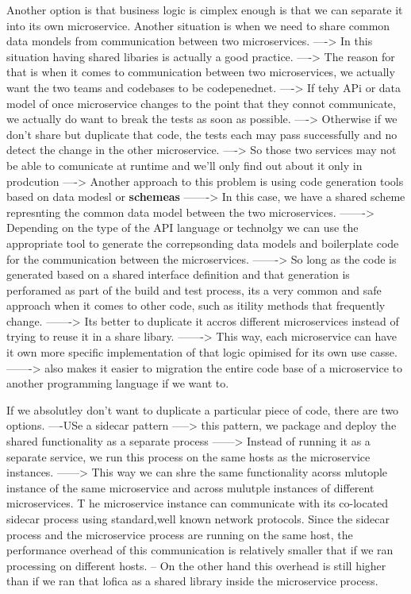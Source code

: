 \documentclass[a4paper, 11pt]{book}
\begin{document}
{    Another option is that business logic is cimplex enough is that we can separate it into its own microservice.
    Another situation is when we need to share common data mondels from communication between two microservices.
    ----> In this situation having shared libaries is actually a good practice.
    ----> The reason for that is when it comes to communication between two microservices, we actually want the two teams and codebases to be codepenednet.
    ----> If tehy APi or data model of once microservice changes to the point that they connot communicate, we actually do want to break the tests as soon as possible.
    ----> Otherwise if we don't share but duplicate that code, the tests each may pass successfully and no detect the change in the other microservice.
    ----> So those two services may not be able to comunicate at runtime and we'll only find out about it only in prodcution
    ----> Another approach to this problem is using code generation tools based on data modesl or \textbf{schemeas}
    -------> In this case, we have a shared scheme represnting the common data model between the two microservices.
    -------> Depending on the type of the API language or technolgy we can use the appropriate tool to generate the correpsonding data models and boilerplate code for the communication between the microservices.
    -------> So long as the code is generated based on a shared interface definition and that generation is perforamed as part of the build and test process, its a very common and safe approach when it comes to other code, such as itility methods that frequently change.
    -------> Its better to duplicate it accros different microservices instead of trying to reuse it in a share libary.
    -------> This way, each microservice can have it own more specific implementation of that logic opimised for its own use casse.
    -------> also makes it easier to migration the entire code base of a microservice to another programming language if we want to.

    If we absolutley don't want to duplicate a particular piece of code, there are two options.
    ----USe a sidecar pattern
    -----> this pattern, we package and deploy the shared functionality as a separate process
    ------> Instead of running it as a separate service, we run this process on the same hosts as the microservice instances.
    ------> This way we can shre the same functionality acorss mlutople instance of the same microservice and across mulutple instances of different microservices.
    T he microservice instance can communicate with its co-located sidecar process using standard,well known network protocols.
    Since the sidecar process and the microservice process are running on the same host, the performance overhead of this communication is relatively smaller that if we ran processing on different hosts.
    -- On the other hand this overhead is still higher than if we ran that lofica as a shared library inside the microservice process.

}
\end{document}
